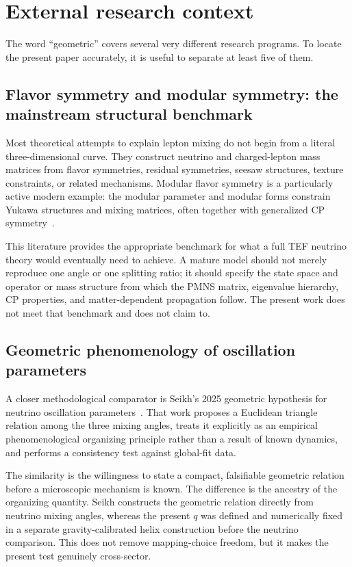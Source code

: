 \documentclass[10pt,twocolumn]{article}
\begin{document}
\section{External research context}
\label{sec:literature}

The word ``geometric'' covers several very different research programs.  To locate
the present paper accurately, it is useful to separate at least five of them.

\subsection{Flavor symmetry and modular symmetry: the mainstream structural benchmark}

Most theoretical attempts to explain lepton mixing do not begin from a literal
three-dimensional curve.  They construct neutrino and charged-lepton mass matrices
from flavor symmetries, residual symmetries, seesaw structures, texture constraints,
or related mechanisms.  Modular flavor symmetry is a particularly active modern
example: the modular parameter and modular forms constrain Yukawa structures and
mixing matrices, often together with generalized CP symmetry~\cite{DingKing2024}.

This literature provides the appropriate benchmark for what a full TEF neutrino
theory would eventually need to achieve.  A mature model should not merely reproduce
one angle or one splitting ratio; it should specify the state space and operator or
mass structure from which the PMNS matrix, eigenvalue hierarchy, CP properties, and
matter-dependent propagation follow.  The present work does not meet that benchmark and
does not claim to.

\subsection{Geometric phenomenology of oscillation parameters}

A closer methodological comparator is Seikh's 2025 geometric hypothesis for
neutrino oscillation parameters~\cite{Seikh2025}.  That work proposes a Euclidean
triangle relation among the three mixing angles, treats it explicitly as an
empirical phenomenological organizing principle rather than a result of known
dynamics, and performs a consistency test against global-fit data.

The similarity is the willingness to state a compact, falsifiable geometric
relation before a microscopic mechanism is known.  The difference is the ancestry
of the organizing quantity.  Seikh constructs the geometric relation directly from
neutrino mixing angles, whereas the present $q$ was defined and numerically fixed in
a separate gravity-calibrated helix construction before the neutrino comparison.
This does not remove mapping-choice freedom, but it makes the present test genuinely
cross-sector.
\end{document}
